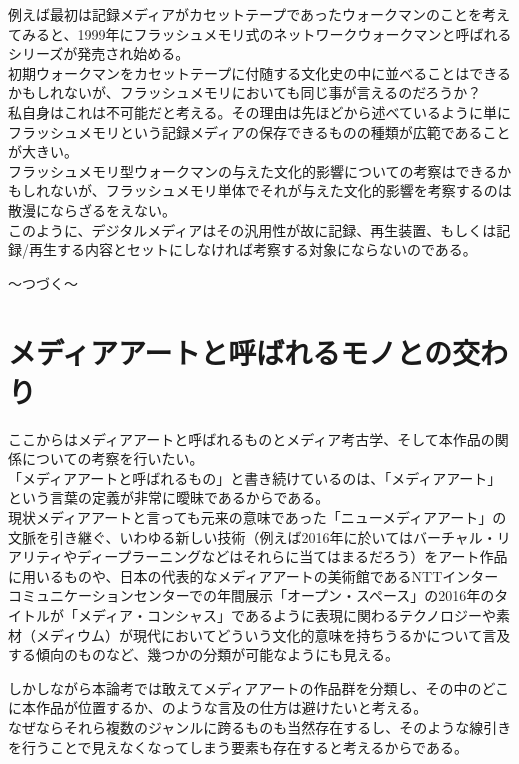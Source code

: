 例えば最初は記録メディアがカセットテープであったウォークマンのことを考えてみると、1999年にフラッシュメモリ式のネットワークウォークマンと呼ばれるシリーズが発売され始める。\\
初期ウォークマンをカセットテープに付随する文化史の中に並べることはできるかもしれないが、フラッシュメモリにおいても同じ事が言えるのだろうか？\\
私自身はこれは不可能だと考える。その理由は先ほどから述べているように単にフラッシュメモリという記録メディアの保存できるものの種類が広範であることが大きい。\\
フラッシュメモリ型ウォークマンの与えた文化的影響についての考察はできるかもしれないが、フラッシュメモリ単体でそれが与えた文化的影響を考察するのは散漫にならざるをえない。\\
このように、デジタルメディアはその汎用性が故に記録、再生装置、もしくは記録/再生する内容とセットにしなければ考察する対象にならないのである。

〜つづく〜

\section{メディアアートと呼ばれるモノとの交わり}\label{ux30e1ux30c7ux30a3ux30a2ux30a2ux30fcux30c8ux3068ux547cux3070ux308cux308bux30e2ux30ceux3068ux306eux4ea4ux308fux308a}

ここからはメディアアートと呼ばれるものとメディア考古学、そして本作品の関係についての考察を行いたい。\\
「メディアアートと呼ばれるもの」と書き続けているのは、「メディアアート」という言葉の定義が非常に曖昧であるからである。\\
現状メディアアートと言っても元来の意味であった「ニューメディアアート」の文脈を引き継ぐ、いわゆる新しい技術（例えば2016年に於いてはバーチャル・リアリティやディープラーニングなどはそれらに当てはまるだろう）をアート作品に用いるものや、日本の代表的なメディアアートの美術館であるNTTインターコミュニケーションセンターでの年間展示「オープン・スペース」の2016年のタイトルが「メディア・コンシャス」であるように表現に関わるテクノロジーや素材（メディウム）が現代においてどういう文化的意味を持ちうるかについて言及する傾向のものなど、幾つかの分類が可能なようにも見える。

しかしながら本論考では敢えてメディアアートの作品群を分類し、その中のどこに本作品が位置するか、のような言及の仕方は避けたいと考える。\\
なぜならそれら複数のジャンルに跨るものも当然存在するし、そのような線引きを行うことで見えなくなってしまう要素も存在すると考えるからである。

